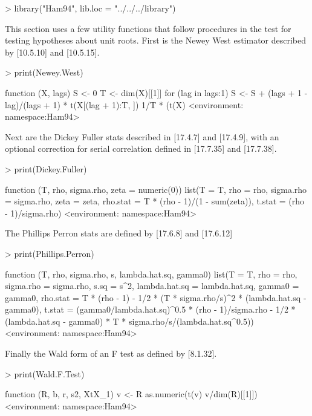 \begin{Schunk}
\begin{Sinput}
> library("Ham94", lib.loc = "../../../library")
\end{Sinput}
\end{Schunk}
This section uses a few utility functions that follow procedures in the test for testing hypotheses about unit roots.
First is the Newey West estimator described by [10.5.10] and [10.5.15].
\begin{Schunk}
\begin{Sinput}
> print(Newey.West)
\end{Sinput}
\begin{Soutput}
function (X, lags) 
{
    S <- 0
    T <- dim(X)[[1]]
    for (lag in lags:1) S <- S + (lags + 1 - lag)/(lags + 1) * 
        t(X[(lag + 1):T, ]) %
    1/T * (t(X) %
}
<environment: namespace:Ham94>
\end{Soutput}
\end{Schunk}
Next are the Dickey Fuller stats described in [17.4.7] and [17.4.9], with an optional correction for
serial correlation defined in [17.7.35] and [17.7.38].
\begin{Schunk}
\begin{Sinput}
> print(Dickey.Fuller)
\end{Sinput}
\begin{Soutput}
function (T, rho, sigma.rho, zeta = numeric(0)) 
{
    list(T = T, rho = rho, sigma.rho = sigma.rho, zeta = zeta, 
        rho.stat = T * (rho - 1)/(1 - sum(zeta)), t.stat = (rho - 
            1)/sigma.rho)
}
<environment: namespace:Ham94>
\end{Soutput}
\end{Schunk}
The Phillips Perron stats are defined by [17.6.8] and [17.6.12]
\begin{Schunk}
\begin{Sinput}
> print(Phillips.Perron)
\end{Sinput}
\begin{Soutput}
function (T, rho, sigma.rho, s, lambda.hat.sq, gamma0) 
{
    list(T = T, rho = rho, sigma.rho = sigma.rho, s.sq = s^2, 
        lambda.hat.sq = lambda.hat.sq, gamma0 = gamma0, rho.stat = T * 
            (rho - 1) - 1/2 * (T * sigma.rho/s)^2 * (lambda.hat.sq - 
            gamma0), t.stat = (gamma0/lambda.hat.sq)^0.5 * (rho - 
            1)/sigma.rho - 1/2 * (lambda.hat.sq - gamma0) * T * 
            sigma.rho/s/(lambda.hat.sq^0.5))
}
<environment: namespace:Ham94>
\end{Soutput}
\end{Schunk}
Finally the Wald form of an F test as defined by [8.1.32].
\begin{Schunk}
\begin{Sinput}
> print(Wald.F.Test)
\end{Sinput}
\begin{Soutput}
function (R, b, r, s2, XtX_1) 
{
    v <- R %
    as.numeric(t(v) %
        v/dim(R)[[1]])
}
<environment: namespace:Ham94>
\end{Soutput}
\end{Schunk}
